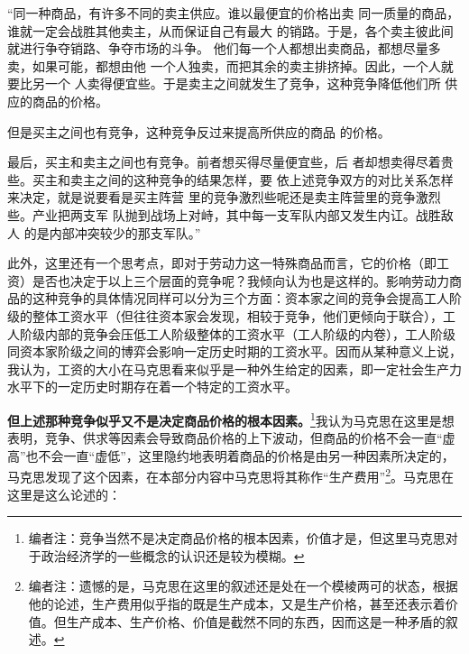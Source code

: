 \documentclass[a4paper,twoside,12pt,AutoFakeBold]{ctexart}
\begin{document}
\begin{adjustwidth}{2em}{2em}
    \qquad\fangsong
    “同一种商品，有许多不同的卖主供应。谁以最便宜的价格出卖
同一质量的商品，谁就一定会战胜其他卖主，从而保证自己有最大
的销路。于是，各个卖主彼此间就进行争夺销路、争夺市场的斗争。
他们每一个人都想出卖商品，都想尽量多卖，如果可能，都想由他
一个人独卖，而把其余的卖主排挤掉。因此，一个人就要比另一个
人卖得便宜些。于是卖主之间就发生了竞争，这种竞争降低他们所
供应的商品的价格。

但是买主之间也有竞争，这种竞争反过来提高所供应的商品
的价格。

最后，买主和卖主之间也有竞争。前者想买得尽量便宜些，后
者却想卖得尽着贵些。买主和卖主之间的这种竞争的结果怎样，要
依上述竞争双方的对比关系怎样来决定，就是说要看是买主阵营
里的竞争激烈些呢还是卖主阵营里的竞争激烈些。产业把两支军
队抛到战场上对峙，其中每一支军队内部又发生内讧。战胜敌人
的是内部冲突较少的那支军队。”
\end{adjustwidth}

此外，这里还有一个思考点，即对于劳动力这一特殊商品而言，它的价格（即工资）是否也决定于以上三个层面的竞争呢？我倾向认为也是这样的。影响劳动力商品的这种竞争的具体情况同样可以分为三个方面：资本家之间的竞争会提高工人阶级的整体工资水平（但往往资本家会发现，相较于竞争，他们更倾向于联合），工人阶级内部的竞争会压低工人阶级整体的工资水平（工人阶级的内卷），工人阶级同资本家阶级之间的博弈会影响一定历史时期的工资水平。因而从某种意义上说，我认为，工资的大小在马克思看来似乎是一种外生给定的因素，即一定社会生产力水平下的一定历史时期存在着一个特定的工资水平。

\textbf{但上述那种竞争似乎又不是决定商品价格的根本因素。}\footnote{编者注：竞争当然不是决定商品价格的根本因素，价值才是，但这里马克思对于政治经济学的一些概念的认识还是较为模糊。}我认为马克思在这里是想表明，竞争、供求等因素会导致商品价格的上下波动，但商品的价格不会一直“虚高”也不会一直“虚低”，这里隐约地表明着商品的价格是由另一种因素所决定的，马克思发现了这个因素，在本部分内容中马克思将其称作“生产费用”\footnote{编者注：遗憾的是，马克思在这里的叙述还是处在一个模棱两可的状态，根据他的论述，生产费用似乎指的既是生产成本，又是生产价格，甚至还表示着价值。但生产成本、生产价格、价值是截然不同的东西，因而这是一种矛盾的叙述。}。马克思在这里是这么论述的：
\end{document}
